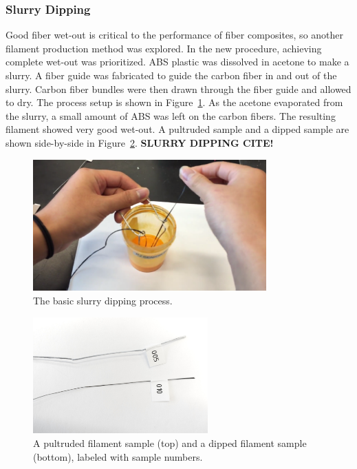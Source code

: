 \clearpage

\subsubsection{Slurry Dipping}

\indent

Good fiber wet-out is critical to the performance of fiber composites, so another filament production method was explored. In the new procedure, achieving complete wet-out was prioritized. ABS plastic was dissolved in acetone to make a slurry. A fiber guide was fabricated to guide the carbon fiber in and out of the slurry. Carbon fiber bundles were then drawn through the fiber guide and allowed to dry. The process setup is shown in Figure~\ref{fig:dipping-vid}. As the acetone evaporated from the slurry, a small amount of ABS was left on the carbon fibers. The resulting filament showed very good wet-out. A pultruded sample and a dipped sample are shown side-by-side in Figure~\ref{fig:two-samples}. \large{\textbf{SLURRY DIPPING CITE!}}\\

\begin{figure}[h!]
    \centering
    \includegraphics[width=0.8\textwidth]{./figures/dipping-vid}
    \caption{The basic slurry dipping process.}
    \label{fig:dipping-vid}
\end{figure}

\begin{figure}[h!]
    \centering
    \includegraphics[width=0.6\textwidth]{./figures/FilamentSample}
    \caption{A pultruded filament sample (top) and a dipped filament sample (bottom), labeled with sample numbers.}
    \label{fig:two-samples}
\end{figure}

